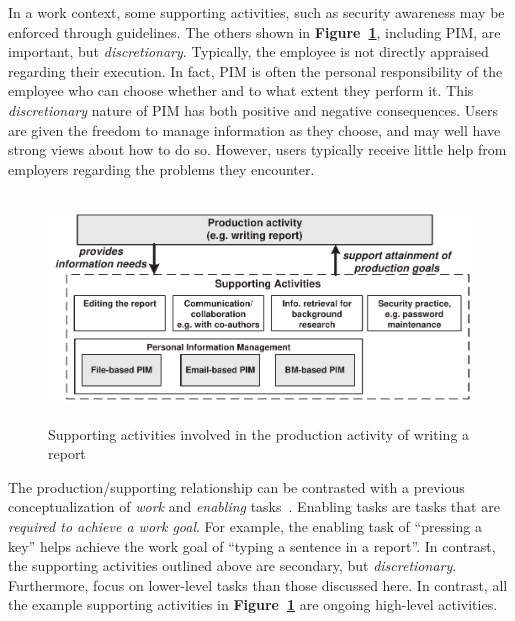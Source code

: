 In a work context, some supporting activities, such as security awareness may be enforced through guidelines.  The others shown in \textbf{Figure~\ref{fig:design:PIM-production-rship-multsupp}}, including PIM, are important, but \textit{discretionary}. Typically, the employee is not directly appraised regarding their execution. In fact, PIM is often the personal responsibility of the employee who can choose whether and to what extent they perform it.  This \textit{discretionary} nature of PIM has both positive and negative consequences.  Users are given the freedom to manage information as they choose, and may well have strong views about how to do so.  However, users typically receive little help from employers regarding the problems they encounter.





\begin{figure}[htbp]
	\begin{center}
		\leavevmode
		\includegraphics[height=6cm]{pictures/discussion/PIM-production-rship-multsupp.pdf}
	\end{center}
	\caption{Supporting activities involved in the production activity of writing a report}
	\label{fig:design:PIM-production-rship-multsupp}
\end{figure}

The production/supporting relationship can be contrasted with a previous conceptualization of \textit{work} and \textit{enabling} tasks~\citep{Whitefield:93}.  Enabling tasks are tasks that are \textit{required to achieve a work goal}. For example, the enabling task of ``pressing a key'' helps achieve the work goal of ``typing a sentence in a report''.  In contrast, the supporting activities outlined above are secondary, but \textit{discretionary}.  Furthermore, \citet{Whitefield:93} focus on lower-level tasks than those discussed here. In contrast, all the example supporting activities in \textbf{Figure~\ref{fig:design:PIM-production-rship-multsupp}} are ongoing high-level activities.  



